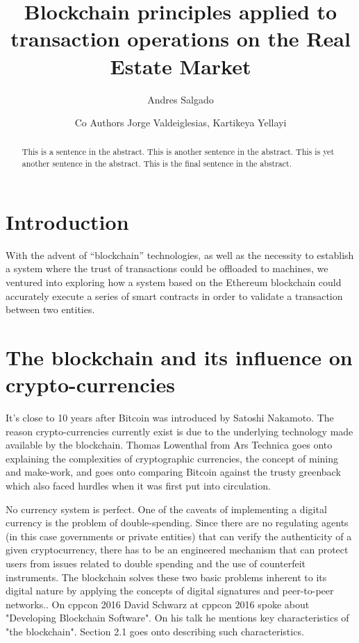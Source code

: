 \documentclass[submission,copyright,creativecommons]{eptcs}
\title{Blockchain principles applied to transaction operations on the Real Estate Market}
\author{Andres Salgado
\institute{International Technological University\\ San Jose, California, \underline{USA}}
\email{salgadoandre533@students.itu.edu}
\and
Co Authors \qquad\qquad Jorge Valdeiglesias, Kartikeya Yellayi
\institute{International Technological University\\ San Jose, California, \underline{USA}}
\email{\quad valdeiglesjorge744@students.itu.edu \quad\qquad yellayishiva1284@students.itu.edu}
}
\begin{document}
\maketitle
{}

\begin{abstract}
This is a sentence in the abstract.
This is another sentence in the abstract.
This is yet another sentence in the abstract.
This is the final sentence in the abstract.
\end{abstract}

\section{Introduction}

With the advent of ``blockchain'' technologies, as well as the necessity to establish a system where the trust of transactions could be offloaded to machines, we ventured into exploring how a system based on the Ethereum blockchain could accurately execute a series of smart contracts in order to validate a transaction between two entities.

\section{The blockchain and its influence on crypto-currencies}

It's close to 10 years after Bitcoin was introduced by Satoshi Nakamoto. The reason crypto-currencies currently exist is due to the underlying technology made available by the blockchain. Thomas Lowenthal from Ars Technica \cite{lowenthalBitcoinEncryptedPeertopeer2011} goes onto explaining the complexities of cryptographic currencies, the concept of mining and make-work, and goes onto comparing Bitcoin against the trusty greenback which also faced hurdles when it was first put into circulation.

No currency system is perfect. One of the caveats of implementing a digital currency is the problem of double-spending.  Since there are no regulating agents (in this case governments or private entities) that can verify the authenticity of a given cryptocurrency, there has to be an engineered mechanism that can protect users from issues related to double spending and the use of counterfeit instruments. The blockchain solves these two basic problems inherent to its digital nature by applying the concepts of digital signatures and peer-to-peer networks.\cite{nakamotoBitcoinPeertoPeerElectronic}\cite{noauthor_bitcoin}.
On cppcon 2016 David Schwarz\cite{cppconCppCon2016David} at cppcon 2016 spoke about "Developing Blockchain Software".  On his talk he mentions key characteristics of "the blockchain". Section 2.1 goes onto describing such characteristics.   
\end{document}
